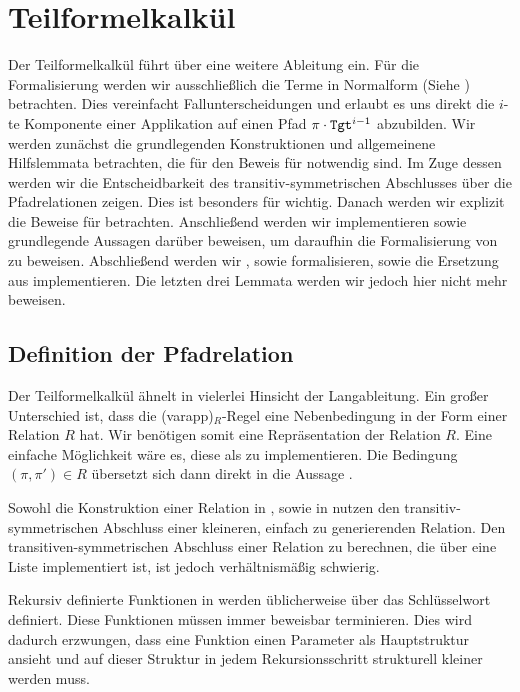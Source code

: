 \section{Teilformelkalkül}

Der Teilformelkalkül führt über  eine weitere Ableitung ein. Für die Formalisierung werden wir ausschließlich die Terme in Normalform (Siehe ) betrachten. Dies vereinfacht Fallunterscheidungen und erlaubt es uns direkt die $i$-te Komponente einer Applikation auf einen Pfad $\pi\cdot\texttt{Tgt}^{i-1}$ abzubilden. Wir werden zunächst die grundlegenden Konstruktionen und allgemeinene Hilfslemmata betrachten, die für den Beweis für  notwendig sind. Im Zuge dessen werden wir die Entscheidbarkeit des transitiv-symmetrischen Abschlusses über die Pfadrelationen zeigen. Dies ist besonders für  wichtig. Danach werden wir explizit die Beweise für  betrachten. Anschließend werden wir  implementieren sowie grundlegende Aussagen darüber beweisen, um daraufhin die Formalisierung von  zu beweisen. Abschließend werden wir , sowie  formalisieren, sowie die Ersetzung aus  implementieren. Die letzten drei Lemmata werden wir jedoch hier nicht mehr beweisen.

\subsection{Definition der Pfadrelation}

Der Teilformelkalkül ähnelt in vielerlei Hinsicht der Langableitung. Ein großer Unterschied ist, dass die (varapp)$_R$-Regel eine Nebenbedingung in der Form einer Relation $R$ hat. Wir benötigen somit eine Repräsentation der Relation $R$. Eine einfache Möglichkeit wäre es, diese als  zu implementieren. Die Bedingung $(\pi, \pi') \in R$ übersetzt sich dann direkt in die Aussage . 

Sowohl die Konstruktion einer Relation in , sowie in  nutzen den transitiv-symmetrischen Abschluss einer kleineren, einfach zu generierenden Relation. Den transitiven-symmetrischen Abschluss einer Relation zu berechnen, die über eine Liste implementiert ist, ist jedoch verhältnismäßig schwierig. 

Rekursiv definierte Funktionen in \coq werden üblicherweise über das Schlüsselwort  definiert. Diese Funktionen müssen immer beweisbar terminieren. Dies wird dadurch erzwungen, dass eine Funktion einen Parameter als Hauptstruktur ansieht und auf dieser Struktur in jedem Rekursionsschritt strukturell kleiner werden muss. 

